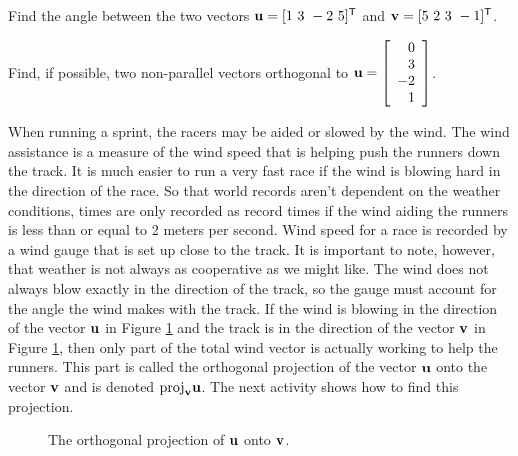\begin{activity} \hfill
	\ba
	\item Find the angle between the two vectors $\mathbf{u} = [1 \ 3 \ -2 \ 5]^{\mathsf{T}}$ and $\mathbf{v} = [5 \  2 \  3  \ -1]^{\mathsf{T}}$.
	
	
	
	\item Find, if possible, two non-parallel vectors orthogonal to $\mathbf{u} = \left[ \begin{array}{r} 0\\3\\-2\\1 \end{array} \right]$.
	
	
	
	\ea
\end{activity}


When running a sprint, the racers may be aided or slowed by the wind. The wind assistance is a measure of the wind speed that is helping push the runners down the track. It is much easier to run a very fast race if the wind is blowing hard in the direction of the race. So that world records aren't dependent on the weather conditions, times are only recorded as record times if the wind aiding the runners is less than or equal to 2 meters per second. Wind speed for a race is recorded by a wind gauge that is set up close to the track. It is important to note, however, that weather is not always as cooperative as we might like. The wind does not always blow exactly in the direction of the track, so the gauge must account for the angle the wind makes with the track. If the wind is blowing in the direction of the vector $\mathbf{u}$ in Figure \ref{F:Projection} and the track is in the direction of the vector $\mathbf{v}$ in Figure \ref{F:Projection}, then only part of the total wind vector is actually working to help the runners. This part is called the orthogonal projection of the vector $\mathbf{u}$ onto the vector $\mathbf{v}$ and is denoted $\text{proj}_{\mathbf{v}} \mathbf{u}$. The next activity shows how to find this projection.

\begin{figure}[h]
\begin{center}
\end{center}
\caption{The orthogonal projection of $\mathbf{u}$ onto $\mathbf{v}$.}
\label{F:Projection}
\end{figure}

